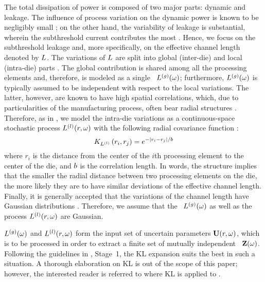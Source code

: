 The total dissipation of power is composed of two major parts: dynamic and leakage. The influence of process variation on the dynamic power is known to be negligibly small \cite{juan2011, juan2012, srivastava2010}; on the other hand, the variability of leakage is substantial, wherein the subthreshold current contributes the most \cite{juan2011, juan2012}. Hence, we focus on the subthreshold leakage and, more specifically, on the effective channel length denoted by $L$. The variations of $L$ are split into global (inter-die) and local (intra-die) parts \cite{chandra2010, juan2011, juan2012, srivastava2010, shen2009}. The global contribution is shared among all the processing elements and, therefore, is modeled as a single \rv\ ${L^{(g)}}(\omega)$; furthermore, ${L^{(g)}}(\omega)$ is typically assumed to be independent with respect to the local variations. The latter, however, are known to have high spatial correlations, which, due to particularities of the manufacturing process, often bear radial structures \cite{friedberg2005, cheng2011}. Therefore, as in \cite{ghanta2006}, we model the intra-die variations as a continuous-space stochastic process $L^{(l)}(r, \omega)$ with the following radial covariance function \cite{ghanem1991}:
\begin{equation} \elabel{covariance-function}
  \fCov{\lLeff}{r_i, r_j} = e^{-|r_i - r_j|/\corrLength}
\end{equation}
where $r_i$ is the distance from the center of the $i$th processing element to the center of the die, and $b$ is the correlation length. In words, the structure implies that the smaller the radial distance between two processing elements on the die, the more likely they are to have similar deviations of the effective channel length. Finally, it is generally accepted that the variations of the channel length have Gaussian distributions \cite{juan2011, juan2012, srivastava2010}. Therefore, we assume that the \rv\ ${L^{(g)}}(\omega)$ as well as the process $L^{(l)}(r, \omega)$ are Gaussian.

${L^{(g)}}(\omega)$ and $L^{(l)}(r, \omega)$ form the input set of uncertain parameters $\mathbf{U}(r, \omega)$, which is to be processed in order to extract a finite set of mutually independent \rvs\ $\mathbf{Z}(\omega)$. Following the guidelines in , Stage~1, the KL expansion suits the best in such a situation. A thorough elaboration on KL is out of the scope of this paper; however, the interested reader is referred to  where KL is applied to .
